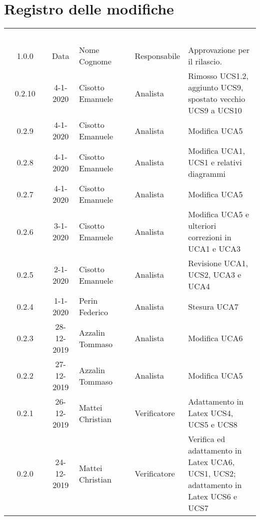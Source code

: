 \section*{Registro delle modifiche}
{
\renewcommand{\arraystretch}{1.5}
\centering
\begin{longtable}{ c c  C{4cm}  C{3cm} C{4cm}}
\textcolor{white}{\textbf{Versione}} & \textcolor{white}{\textbf{Data}} & \textcolor{white}{\textbf{Nominativo}} & \textcolor{white}{\textbf{Ruolo}} & \textcolor{white}{\textbf{Descrizione}}\\	


1.0.0 & Data & Nome Cognome & Responsabile & Approvazione per il rilascio.  \\

0.2.10 & 4-1-2020 & Cisotto Emanuele & Analista & Rimosso UCS1.2, aggiunto UCS9, spostato vecchio UCS9 a UCS10 \\

0.2.9 & 4-1-2020 & Cisotto Emanuele & Analista & Modifica UCA5 \\

0.2.8 & 4-1-2020 & Cisotto Emanuele & Analista & Modifica UCA1, UCS1 e relativi diagrammi \\

0.2.7 & 4-1-2020 & Cisotto Emanuele & Analista & Modifica UCA5 \\

0.2.6 & 3-1-2020 & Cisotto Emanuele & Analista & Modifica UCA5 e ulteriori correzioni in UCA1 e UCA3 \\

0.2.5 & 2-1-2020 & Cisotto Emanuele & Analista & Revisione UCA1, UCS2, UCA3 e UCA4 \\

0.2.4 & 1-1-2020 & Perin Federico & Analista & Stesura UCA7 \\

0.2.3 & 28-12-2019 & Azzalin Tommaso & Analista & Modifica UCA6 \\

0.2.2 & 27-12-2019 & Azzalin Tommaso & Analista & Modifica UCA5 \\

0.2.1 & 26-12-2019 & Mattei Christian & Verificatore & Adattamento in Latex UCS4, UCS5 e UCS8 \\

0.2.0 & 24-12-2019 & Mattei Christian & Verificatore & Verifica ed adattamento in Latex UCA6, UCS1, UCS2; adattamento in Latex UCS6 e UCS7 \\


\end{longtable}}
